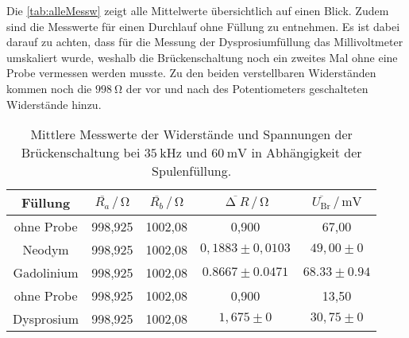\noindent
Die \autoref{tab:alleMessw} zeigt alle Mittelwerte übersichtlich auf einen Blick. Zudem sind die Messwerte für einen Durchlauf ohne Füllung zu entnehmen.
Es ist dabei darauf zu achten, dass für die Messung der Dysprosiumfüllung das Millivoltmeter umskaliert wurde, weshalb die Brückenschaltung noch ein zweites Mal ohne eine Probe vermessen werden musste.
Zu den beiden verstellbaren Widerständen kommen noch die $\SI{998}{\ohm}$ der vor und nach des Potentiometers geschalteten Widerstände hinzu.
\begin{table}[H]
  \centering
  \caption{Mittlere Messwerte der Widerstände und Spannungen der Brückenschaltung bei $\SI{35}{\kilo\hertz}$ und $\SI{60}{\milli\volt}$ in Abhängigkeit der Spulenfüllung.}
  \label{tab:alleMessw}
  \begin{tabular}{c| c c c c}
    \toprule
    Füllung & $\overline{R_a} \,/\, \si{\ohm}$ & $\overline{R_b} \,/\, \si{\ohm}$ & $\overline{\upDelta R} \,/\, \si{\ohm}$ & $\overline{U_{\text{Br}}} \,/\, \si{\milli\volt}$ \\
    \midrule
    ohne Probe & 998,925 & 1002,08 & 0,900 & 67,00 \\
    Neodym & 998,925 & 1002,08 & $0,1883 \pm 0,0103$ & $49,00 \pm 0$\\ 
    Gadolinium & 998,925 & 1002,08 & $0.8667 \pm 0.0471$ & $68.33 \pm 0.94$\\ \hline
    ohne Probe & 998,925 & 1002,08 & 0,900 & 13,50 \\
    Dysprosium & 998,925 & 1002,08 & $1,675 \pm 0$ & $30,75 \pm 0$ \\
    \bottomrule
  \end{tabular}
\end{table}

